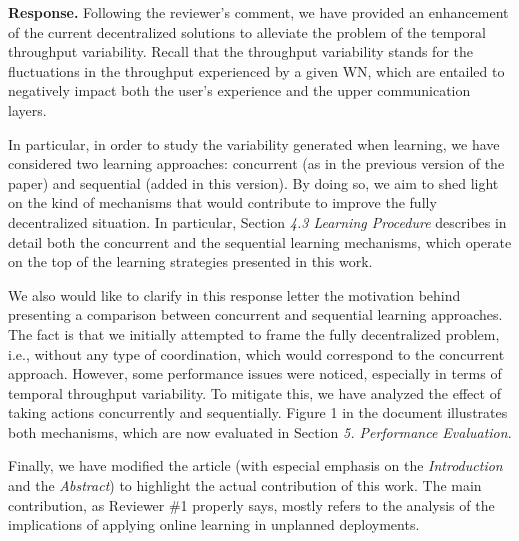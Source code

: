 \documentclass[a4paper,twoside,11pt]{reviewresponse}
\begin{document}
\textbf{Response.} Following the reviewer's comment, we have provided an enhancement of the current decentralized solutions to alleviate the problem of the temporal throughput variability. Recall that the throughput variability stands for the fluctuations in the throughput experienced by a given WN, which are entailed to negatively impact both the user's experience and the upper communication layers.

In particular, in order to study the variability generated when learning, we have considered two learning approaches: concurrent (as in the previous version of the paper) and sequential (added in this version). By doing so, we aim to shed light on the kind of mechanisms that would contribute to improve the fully decentralized situation. In particular, Section \textit{4.3 Learning Procedure} describes in detail both the concurrent and the sequential learning mechanisms, which operate on the top of the learning strategies presented in this work.

We also would like to clarify in this response letter the motivation behind presenting a comparison between concurrent and sequential learning approaches. The fact is that we initially attempted to frame the fully decentralized problem, i.e., without any type of coordination, which would correspond to the concurrent approach. However, some performance issues were noticed, especially in terms of temporal throughput variability. To mitigate this, we have analyzed the effect of taking actions concurrently and sequentially. Figure 1 in the document illustrates both mechanisms, which are now evaluated in Section \textit{5. Performance Evaluation}. 

Finally, we have modified the article (with especial emphasis on the \textit{Introduction} and the \textit{Abstract}) to highlight the actual contribution of this work. The main contribution, as Reviewer \#1 properly says, mostly refers to the analysis of the implications of applying online learning in unplanned deployments. 

\end{document}
